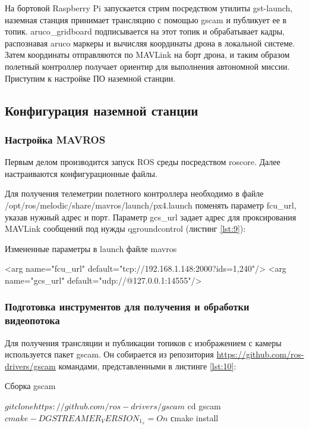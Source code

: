 На бортовой Raspberry Pi запускается стрим посредством утилиты gst-launch, наземная станция принимает трансляцию с помощью gscam и публикует ее в топик. aruco\_gridboard подписывается на этот топик и обрабатывает кадры, распознавая aruco маркеры и вычисляя координаты дрона в локальной системе. Затем координаты отправляются по MAVLink на борт дрона, и таким образом полетный контроллер получает ориентир для выполнения автономной миссии. Приступим к настройке ПО наземной станции.


\subsection{Конфигурация наземной станции}

\subsubsection{Настройка MAVROS}

Первым делом производится запуск ROS среды посредством roscore. Далее настраиваются конфигурационные файлы.

Для получения телеметрии полетного контроллера необходимо в файле /opt/ros/melodic/share/mavros/launch/px4.launch поменять параметр fcu\_url, указав нужный адрес и порт. Параметр gcs\_url задает адрес для проксирования MAVLink сообщений под нужды qgroundcontrol (листинг \ref{lst:9}):
\begin{Program}[H]
	\caption{Измененные параметры в launch файле mavros} \label{lst:9}
\begin{MyCode}
<arg name="fcu_url" default="tcp://192.168.1.148:2000?ids=1,240"/>   
<arg name="gcs_url" default="udp://@127.0.0.1:14555"/>
\end{MyCode}
\end{Program}

\subsubsection{Подготовка инструментов для получения и обработки видеопотока}
Для получения трансляции и публикации топиков с изображением с камеры используется пакет gscam. Он собирается из репозитория \url{https://github.com/ros-drivers/gscam} командами, представленными в листинге \ref{lst:10}:
\begin{Program}[H]
	\caption{Сборка gscam} \label{lst:10}
\begin{MyCode}
$ git clone https://github.com/ros-drivers/gscam
$ cd gscam
$ cmake -DGSTREAMER_VERSION_1_x=On
$ сmake install
\end{MyCode}
\end{Program}

